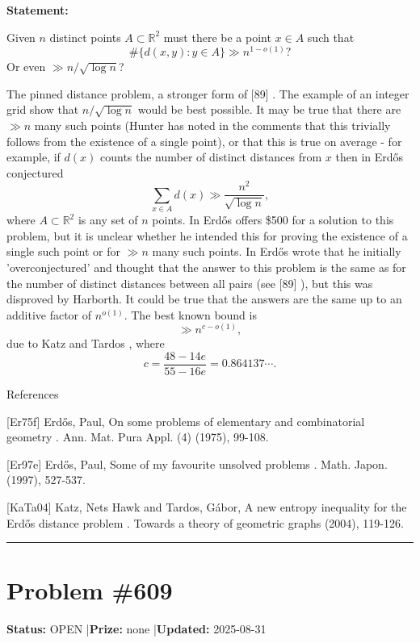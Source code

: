 \documentclass{article}
\begin{document}
\noindent\textbf{Statement:}

Given $n$ distinct points $A\subset\mathbb{R}^2$ must there be a point $x\in A$ such that\[\#\{ d(x,y) : y \in A\} \gg n^{1-o(1)}?\]Or even $\gg n/\sqrt{\log n}$?




The pinned distance problem, a stronger form of [89] . The example of an integer grid show that $n/\sqrt{\log n}$ would be best possible. It may be true that there are $\gg n$ many such points (Hunter has noted in the comments that this trivially follows from the existence of a single point), or that this is true on average - for example, if $d(x)$ counts the number of distinct distances from $x$ then in \cite{Er75f} Erd\H{o}s conjectured\[\sum_{x\in A}d(x) \gg \frac{n^2}{\sqrt{\log n}},\]where $A\subset \mathbb{R}^2$ is any set of $n$ points. In \cite{Er97e} Erd\H{o}s offers \$500 for a solution to this problem, but it is unclear whether he intended this for proving the existence of a single such point or for $\gg n$ many such points. In \cite{Er97e} Erd\H{o}s wrote that he initially 'overconjectured' and thought that the answer to this problem is the same as for the number of distinct distances between all pairs (see [89] ), but this was disproved by Harborth. It could be true that the answers are the same up to an additive factor of $n^{o(1)}$. The best known bound is\[\gg n^{c-o(1)},\]due to Katz and Tardos \cite{KaTa04}, where\[c=\frac{48-14e}{55-16e}=0.864137\cdots.\]




References

[Er75f] Erd\H{o}s, Paul, On some problems of elementary and combinatorial geometry . Ann. Mat. Pura Appl. (4) (1975), 99-108.

[Er97e] Erd\H{o}s, Paul, Some of my favourite unsolved problems . Math. Japon. (1997), 527-537.

[KaTa04] Katz, Nets Hawk and Tardos, G\'{a}bor, A new entropy inequality for the Erd\H{o}s distance problem . Towards a theory of geometric graphs (2004), 119-126.

\noindent\rule{\linewidth}{0.4pt}


\section{Problem \#609}
\label{prob:609}

\noindent\textbf{Status:} OPEN \quad|\quad \textbf{Prize:} none \quad|\quad \textbf{Updated:} 2025-08-31
\end{document}
